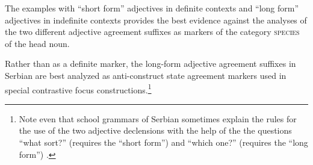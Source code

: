 The examples with “short form” adjectives in definite contexts and “long form” adjectives in indefinite contexts provides the best evidence against the analyses of the two different adjective agreement suffixes as markers of the category \textsc{species} of the head noun. 

Rather than as a definite marker, the long-form adjective agreement suffixes in Serbian are best analyzed as anti\hyp{}construct state agreement markers used in special contrastive focus constructions.\footnote{Note even that school grammars of Serbian sometimes explain the rules for the use of the two adjective declensions with the help of the the questions “what sort?” (requires the “short form”) and “which one?” (requires the “long form”) \citep[327]{browne1993}.}

